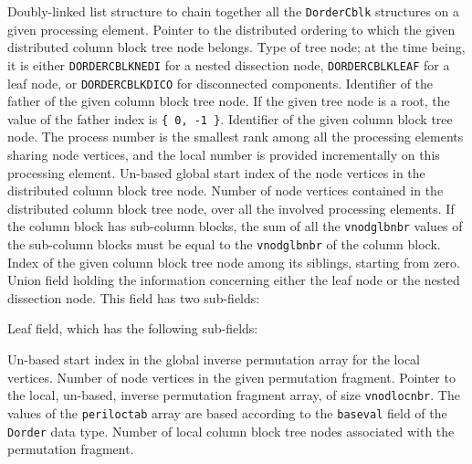 \begin{itemize}
  Doubly-linked list structure to chain together all
  the \texttt{Dorder\lbt Cblk} structures on a given processing
  element.
  Pointer to the distributed ordering to which the given distributed
  column block tree node belongs.
  Type of tree node; at the time being, it is either
  \texttt{DORDER\lbt CBLK\lbt NEDI} for a nested dissection node,
  \texttt{DORDER\lbt CBLK\lbt LEAF} for a leaf node, or
  \texttt{DORDER\lbt CBLK\lbt DICO} for disconnected components.
  Identifier of the father of the given column block tree node. If the
  given tree node is a root, the value of the father index is
  \texttt{\{~0, -1~\}}.
  Identifier of the given column block tree node. The process number
  is the smallest rank among all the processing elements sharing node
  vertices, and the local number is provided incrementally on this
  processing element.
  Un-based global start index of the node vertices in the distributed
  column block tree node.
  Number of node vertices contained in the distributed column block
  tree node, over all the involved processing elements. If the
  column block has sub-column blocks, the sum of all the
  \texttt{vnodglbnbr} values of the sub-column blocks must be equal to
  the \texttt{vnodglbnbr} of the column block.
  Index of the given column block tree node among its siblings,
  starting from zero.
  Union field holding the information concerning either the leaf node
  or the nested dissection node. This field has two sub-fields:
  \begin{itemize}
    Leaf field, which has the following sub-fields:
    \begin{itemize}
      Un-based start index in the global inverse permutation array for
      the local vertices.
      Number of node vertices in the given permutation fragment.
      Pointer to the local, un-based, inverse permutation fragment
      array, of size \texttt{vnod\lbt loc\lbt nbr}. The values of the
      \texttt{peri\lbt loc\lbt tab} array are based according to the
      \texttt{baseval} field of the \texttt{Dorder} data type.
      Number of local column block tree nodes associated with the
      permutation fragment.

\end{itemize}
\end{itemize}
\end{itemize}
